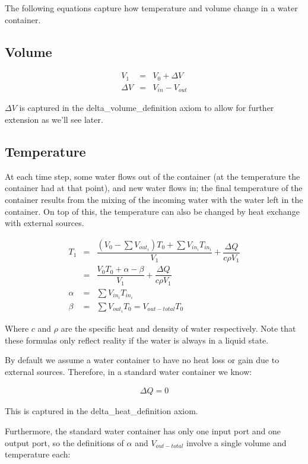 \documentclass[a4paper,12pt]{article}
\begin{document}
The following equations capture how temperature and volume change in a water container.

\subsection{Volume}

\begin{eqnarray*}
V_1 &=& V_0 + \Delta V\\
\Delta V &=& V_{in} - V_{out}
\end{eqnarray*}

$\Delta V$ is captured in the delta\_volume\_definition axiom to allow for further extension as we'll see later.

\subsection{Temperature}

At each time step, some water flows out of the container (at the temperature the container had at that point), and new water flows in; the final temperature of the container results from the mixing of the incoming water with the water left in the container. On top of this, the temperature can also be changed by heat exchange with external sources.

\begin{eqnarray*}
T_1 &=& \dfrac{(V_0 - \sum{V_{out_{i}}})T_0 + \sum{V_{in_{i}} T_{in_{i}}}}{V_1} + \dfrac{\Delta Q}{c \rho V_1}\\
&=& \dfrac{V_{0} T_0 + \alpha - \beta}{V_1} + \dfrac{\Delta Q}{c \rho V_{1}}\\
\alpha &=& \sum{V_{in_{i}}T_{in_{i}}}\\
\beta &=& \sum{V_{out_{i}}T_0} = V_{out-total}T_{0}
\end{eqnarray*}

Where $c$ and $\rho$ are the specific heat and density of water respectively. Note that these formulas only reflect reality if the water is always in a liquid state.

By default we assume a water container to have no heat loss or gain due to external sources. Therefore, in a standard water container we know:

\begin{eqnarray*}
\Delta Q = 0
\end{eqnarray*}

This is captured in the delta\_heat\_definition axiom. 

Furthermore, the standard water container has only one input port and one output port, so the definitions of $\alpha$ and $V_{out-total}$ involve a single volume and temperature each:
\end{document}
